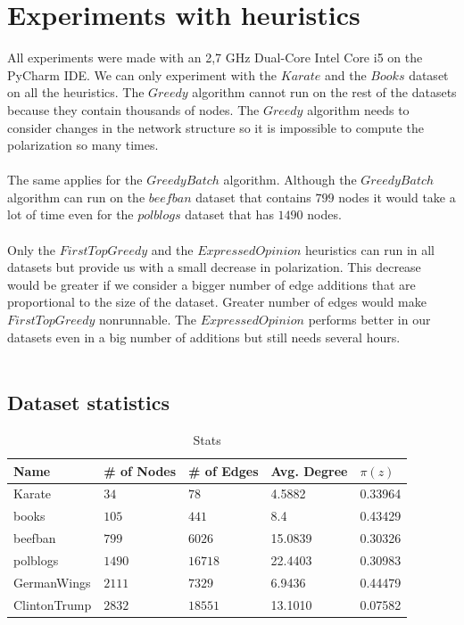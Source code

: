 \section{Experiments with heuristics}
\label{sec:experimHeuristics}

All experiments were made with an 2,7 GHz Dual-Core Intel Core i5 on the PyCharm IDE. We can only experiment with the $Karate$ and the $Books$ dataset on all the heuristics. The $Greedy$ algorithm cannot run on the rest of the datasets because they contain thousands of nodes. The $Greedy$ algorithm needs to consider changes in the network structure so it is impossible to compute the polarization so many times.
\\
\\ 
The same applies for the $GreedyBatch$ algorithm. Although the $GreedyBatch$ algorithm can run on the $beefban$ dataset that contains $799$ nodes it would take a lot of time even for the $polblogs$ dataset that has $1490$ nodes.
\\
\\
Only the $FirstTopGreedy$ and the $Expressed Opinion$ heuristics can run in all datasets but provide us with a small decrease in polarization. This decrease would be greater if we consider a bigger number of edge additions that are proportional to the size of the dataset. Greater number of edges would make $FirstTopGreedy$ nonrunnable. The $Expressed Opinion$ performs better in our datasets even in a big number of additions but still needs several hours. 
\\
\\
\clearpage

\subsection{Dataset statistics}

\begin{table}[H]
 \centering
 \caption{Stats}
 \label{tab:statistics}
 \begin{tabular}{| l || l | l | l | l |}
 \hline
  Name & \# of Nodes & \# of Edges & Avg. Degree & $\pi(z)$\\
  \hline
  \hline
  Karate & $34$ & $78$ & 4.5882 &  0.33964\\
  \hline
    books & $105$ & $441$ & 8.4 &  0.43429\\
  \hline
    beefban & $799$ & $6026$ & 15.0839 &  0.30326\\
  \hline
  polblogs & $1490$ & $16718$ & 22.4403 &  0.30983\\
  \hline
  GermanWings & $2111$ & $7329$ & 6.9436 &  0.44479\\
  \hline
  ClintonTrump & $2832$ & $18551$ & 13.1010 &  0.07582\\
  \hline
 \end{tabular}
 \end{table}
 
